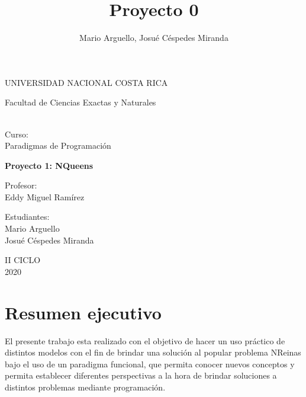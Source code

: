 \documentclass[12pt,a4paper]{article}
\author{Mario Arguello, Josué Céspedes Miranda}
\title{Proyecto 0}
\begin{document}
\begin{titlepage}
\begin{center}
\begin{large}
UNIVERSIDAD NACIONAL COSTA RICA \\
\begin{figure}[htp]
\centering
\label{foto}
\end{figure}
\end{large}
\begin{large}
Facultad de Ciencias Exactas y Naturales
\end{large} 
\begin{large}
\vspace*{1cm}\\
Curso:\\
\vspace*{2mm}
Paradigmas de Programación\\
\end{large}
\vspace*{8mm}
\begin{large}
\textbf{Proyecto 1: 
NQueens
}\\
\end{large}
\begin{figure}[htp]
\centering
\label{foto}
\end{figure}
\begin{large}
\vspace*{1cm}
Profesor:\\
\vspace*{5mm}
Eddy Miguel Ramírez\\
\end{large}
\begin{large}
\vspace*{1cm}
Estudiantes: \\
\vspace*{5mm}
Mario Arguello \\
Josué Céspedes Miranda \\
\end{large}
\vspace*{1cm}
II CICLO\\
\vspace*{1cm}
2020
\end{center}
\end{titlepage}
\tableofcontents
\pagebreak
\section{Resumen ejecutivo}
\bigskip
 	El presente trabajo esta realizado con el objetivo de hacer un uso práctico de distintos modelos con el fin de brindar una solución al popular problema NReinas bajo el uso de un paradigma funcional, que permita conocer nuevos conceptos y permita establecer diferentes perspectivas a la hora de brindar soluciones a distintos problemas mediante programación. \\
 	
\end{document}
